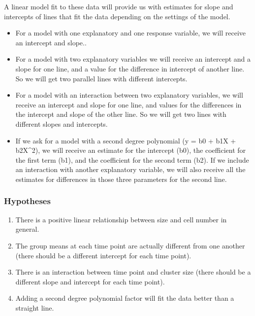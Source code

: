 \documentclass[]{article}
\providecommand{\tightlist}{%
  \setlength{\itemsep}{0pt}\setlength{\parskip}{0pt}}
\begin{document}
A linear model fit to these data will provide us with estimates for
slope and intercepts of lines that fit the data depending on the
settings of the model.

\begin{itemize}
\tightlist
\item
  For a model with one explanatory and one response variable, we will
  receive an intercept and slope..
\item
  For a model with two explanatory variables we will receive an
  intercept and a slope for one line, and a value for the difference in
  intercept of another line. So we will get two parallel lines with
  different intercepts.
\item
  For a model with an interaction between two explanatory variables, we
  will receive an intercept and slope for one line, and values for the
  differences in the intercept and slope of the other line. So we will
  get two lines with different slopes and intercepts.
\item
  If we ask for a model with a second degree polynomial (y = b0 + b1X +
  b2X\^{}2), we will receive an estimate for the intercept (b0), the
  coefficient for the first term (b1), and the coefficient for the
  second term (b2). If we include an interaction with another
  explanatory variable, we will also receive all the estimates for
  differences in those three parameters for the second line.
\end{itemize}

\subsubsection{Hypotheses}\label{hypotheses}

\begin{enumerate}
\def\labelenumi{\arabic{enumi}.}
\tightlist
\item
  There is a positive linear relationship between size and cell number
  in general.
\item
  The group means at each time point are actually different from one
  another (there should be a different intercept for each time point).
\item
  There is an interaction between time point and cluster size (there
  should be a different slope and intercept for each time point).
\item
  Adding a second degree polynomial factor will fit the data better than
  a straight line.
\end{enumerate}
\end{document}
